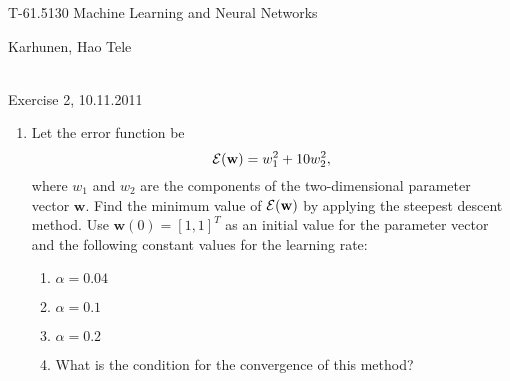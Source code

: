 \documentclass[10pt]{article}
\begin{document}
\pagestyle{empty}
\begin{Large}
\begin{bf} 
T-61.5130 Machine Learning and Neural Networks\\ 
\end{bf}
\end{Large}
Karhunen, Hao Tele\\  
\\
\begin{large}
\begin{bf}
Exercise 2,  10.11.2011
\end{bf}
\end{large}
\begin{enumerate}

\item Let the error function be
\begin{equation*}
{\cal E}(\mathbf{w})=w_1^2+10w_2^2,
\end{equation*}
where $w_1$ and $w_2$ are the components of the two-dimensional
parameter vector $\mathbf{w}$. Find the minimum value of ${\cal
E}(\mathbf{w})$ by applying the steepest descent method. Use
$\mathbf{w}(0)=[1,1]^T$ as an initial value for the parameter vector
and the following constant values for the learning rate:
\begin{enumerate} \item $\alpha=0.04$ \item $\alpha=0.1$ \item
$\alpha=0.2$ 
\item What is the condition for the convergence of this method?
\end{enumerate}



\end{enumerate}
\end{document}
